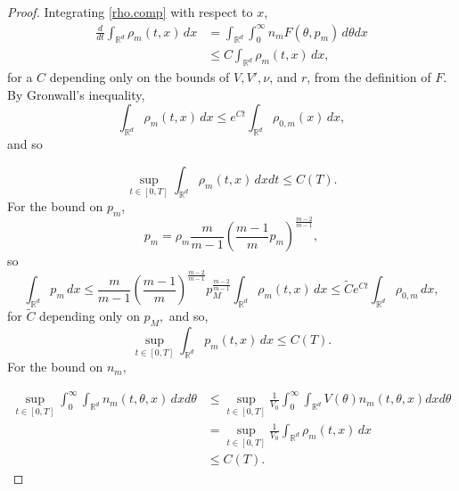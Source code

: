 \documentclass{amsart}
\def\R{\mathbb R}
\begin{document}
\begin{proof}
    Integrating \eqref{rho.comp} with respect to $x$,
    \begin{align*}
        \frac{d}{dt}\int_{\R^d}\rho_m(t,x) \,dx&=\int_{\R^d}\int_{0}^{\infty}n_mF(\theta,p_m)\, d\theta dx\\
        & \leq C\int_{\R^d}\rho_m(t,x)\,dx,
    \end{align*}
    for a $C$ depending only on the bounds of $V, V', \nu$, and $r$, from the definition of $F$.
    By Gronwall's inequality,
    \begin{equation*}
        \int_{\R^d}\rho_m(t,x)\, dx \leq e^{Ct}\int_{\R^d}\rho_{0,m}(x)\, dx,
    \end{equation*}
    and so 
   
    \begin{equation*}
        \sup_{t \in[0,T]}\int_{\R^d}\rho_m(t,x)\,dx dt \leq C(T).
    \end{equation*}
    For the bound on $p_m$,
    $$
    p_m=\rho_m\frac{m}{m-1}(\frac{m-1}{m}p_m)^{\frac{m-2}{m-1}},
    $$
    so $$
    \int_{\R^d}p_m\,dx \leq \frac{m}{m-1}(\frac{m-1}{m})^\frac{m-2}{m-1}p_M^{\frac{m-2}{m-1}}\int_{\R^d}\rho_m(t,x)\,dx \leq \tilde{C}e^{Ct}\int_{\R^d}\rho_{0,m}\,dx,$$
    for $\tilde{C}$ depending only on $p_M,$
    and so,
    $$
    \sup_{t\in[0,T]}\int_{\R^d}p_m(t,x)\,dx \leq C(T).
    $$
    For the bound on $n_m$,
  
    \begin{align*}
        \sup_{t\in[0,T]}\int_{0}^{\infty}\int_{\R^d}n_m(t,\theta,x)\,dxd\theta&\leq\sup_{t\in [0,T]}\frac{1}{V_0}\int_{0}^{\infty}\int_{\R^d}V(\theta)n_m(t,\theta,x)dx d\theta
        \\ &=\sup_{t\in[0,T]}\frac{1}{V_0}\int_{\R^d}\rho_m(t,x)\,dx\\ &\leq C(T).
    \end{align*}
   
\end{proof}
\end{document}
